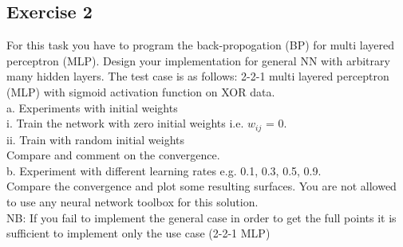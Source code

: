 \documentclass[a4paper, 12pt]{article}
\begin{document}
\subsection{Exercise 2}

For this task you have to program the back-propogation (BP) for multi layered perceptron (MLP). Design your implementation for general NN with arbitrary many hidden layers. The test case is as follows:  2-2-1 multi layered perceptron (MLP) with sigmoid activation function on XOR data. \\

a. Experiments with initial weights\\

i. Train the network with zero initial weights i.e. $w_{ij}$ = 0.\\

ii. Train with random initial weights\\

Compare and comment on the convergence.\\

b. Experiment with different learning rates e.g. 0.1, 0.3, 0.5, 0.9.\\

Compare the convergence and plot some resulting surfaces. You are not allowed to use any neural network toolbox for this solution.\\

NB: If you fail to implement the general case in order to get the full points it is sufficient to implement only the use case (2-2-1 MLP)\\

\lstset{language=Python}
\begin{lstlisting}[frame=single]

\end{lstlisting}
\end{document}

